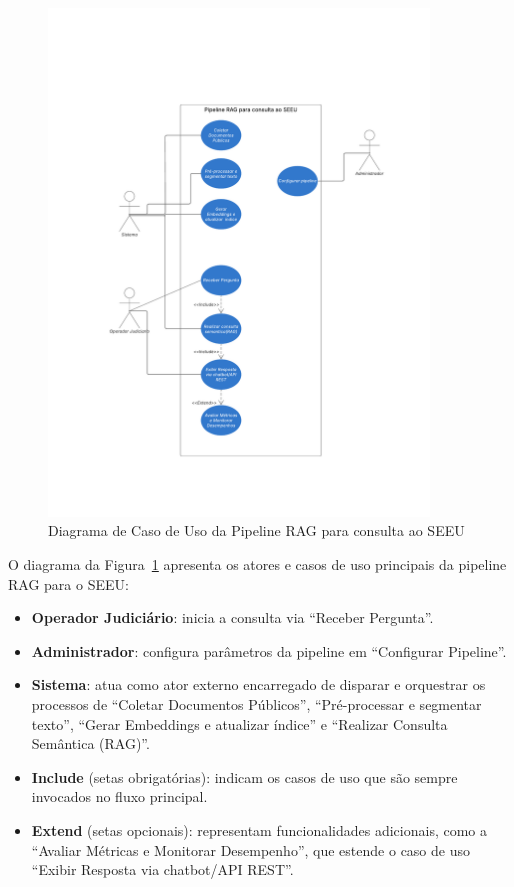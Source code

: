 \begin{figure}[H]
  \centering
  \includegraphics[width=0.9\textwidth]{04-figuras/diagrama_em_branco.pdf}
  \caption{Diagrama de Caso de Uso da Pipeline RAG para consulta ao SEEU}
  \label{fig:diagrama-rag-seeu}
\end{figure}

\noindent
O diagrama da Figura~\ref{fig:diagrama-rag-seeu} apresenta os atores e casos de uso principais da pipeline RAG para o SEEU:  
\begin{itemize}
  \item \textbf{Operador Judiciário}: inicia a consulta via “Receber Pergunta”.  
  \item \textbf{Administrador}: configura parâmetros da pipeline em “Configurar Pipeline”.  
  \item \textbf{Sistema}: atua como ator externo encarregado de disparar e orquestrar os processos de “Coletar Documentos Públicos”, “Pré-processar e segmentar texto”, “Gerar Embeddings e atualizar índice” e “Realizar Consulta Semântica (RAG)”.  
  \item \textbf{Include} (setas obrigatórias): indicam os casos de uso que são sempre invocados no fluxo principal.  
  \item \textbf{Extend} (setas opcionais): representam funcionalidades adicionais, como a “Avaliar Métricas e Monitorar Desempenho”, que estende o caso de uso “Exibir Resposta via chatbot/API REST”.  
\end{itemize}  



